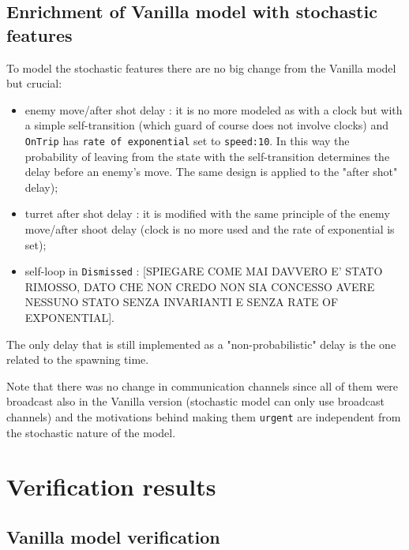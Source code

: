 \documentclass[
10pt, %
a4paper, %
oneside, %
headinclude,footinclude, %
BCOR5mm, %
]{scrartcl}
\begin{document}
		\subsection{Enrichment of Vanilla model with stochastic features}
			To model the stochastic features there are no big change from the Vanilla model but crucial:
			\begin{itemize}
				\item enemy move/after shot delay : it is no more modeled as with a clock but with a simple self-transition (which guard of course does not involve clocks) and \texttt{OnTrip} has \texttt{rate of exponential} set to \texttt{speed:10}. In this way the probability of leaving from the state with the self-transition determines the delay before an enemy's move. The same design is applied to the "after shot" delay);
				\item turret after shot delay : it is modified with the same principle of the enemy move/after shoot delay (clock is no more used and the rate of exponential is set);
				\item self-loop in \texttt{Dismissed} : [SPIEGARE COME MAI DAVVERO E' STATO RIMOSSO, DATO CHE NON CREDO NON SIA CONCESSO AVERE NESSUNO STATO SENZA INVARIANTI E SENZA RATE OF EXPONENTIAL].
			\end{itemize}
			The only delay that is still implemented as a "non-probabilistic" delay is the one related to the spawning time.
			
			Note that there was no change in communication channels since all of them were broadcast also in the Vanilla version (stochastic model can only use broadcast channels) and the motivations behind making them \texttt{urgent} are independent from the stochastic nature of the model.
	\section{Verification results}
		\subsection{Vanilla model verification}
\end{document}
